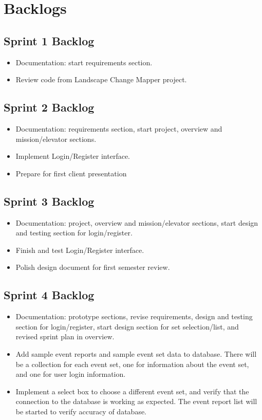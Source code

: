 \section{Backlogs}

\subsection{Sprint 1 Backlog}
\begin{itemize}
\itemsep0em
\item Documentation: start requirements section.
\item Review code from Landscape Change Mapper project.
\end{itemize}

\subsection{Sprint 2 Backlog}
\begin{itemize}
\itemsep0em
\item Documentation: requirements section, start project, overview and mission/elevator sections.
\item Implement Login/Register interface.
\item Prepare for first client presentation
\end{itemize}

\subsection{Sprint 3 Backlog}
\begin{itemize}
\itemsep0em
\item Documentation: project, overview and mission/elevator sections, start design and testing section for login/register.
\item Finish and test Login/Register interface.
\item Polish design document for first semester review.
\end{itemize}

\subsection{Sprint 4 Backlog}
\begin{itemize}
\itemsep0em
\item Documentation: prototype sections, revise requirements, design and testing section for login/register, start design section for set selection/list, and revised sprint plan in overview.
\item Add sample event reports and sample event set data to database. There will be a collection for each event set, one for information about the event set, and one for user login information.
\item Implement a select box to choose a different event set, and verify that the connection to the database is working as expected. The event report list will be started to verify accuracy of database.
\end{itemize}

